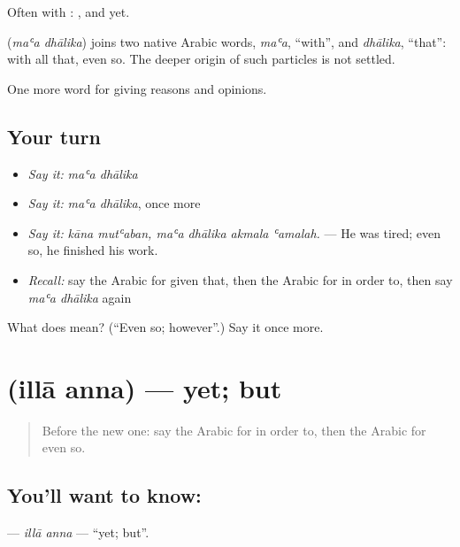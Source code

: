 Often with :  , and yet.

\begin{cousinweb}
\textbf{ } (\emph{maʿa dhālika}) joins two native Arabic words, \emph{maʿa}, \textquotedblleft{}with\textquotedblright{}, and \emph{dhālika}, \textquotedblleft{}that\textquotedblright{}: with all that, even so. The deeper origin of such particles is not settled.
\end{cousinweb}

\begin{grammarlens}[title={What you've built}]
One more word for giving reasons and opinions.
\end{grammarlens}

\subsection*{Your turn}
\begin{itemize}
\raggedright
  \item \emph{Say it:} \emph{maʿa dhālika}
  \item \emph{Say it:} \emph{maʿa dhālika}, once more
  \item \emph{Say it:} \emph{kāna mutʿaban, maʿa dhālika akmala ʿamalah.} — He was tired; even so, he finished his work.
  \item \emph{Recall:} say the Arabic for given that, then the Arabic for in order to, then say \emph{maʿa dhālika} again
\end{itemize}

\begin{tcolorbox}[breakable,colback=teal!4,colframe=teal!35!black,title={Before you move on}]
What does   mean? (\textquotedblleft{}Even so; however\textquotedblright{}.) Say it once more.
\end{tcolorbox}
\section[\texorpdfstring{\ar{إلا} \ar{أن} (illā anna)}{إلا أن (illā anna)}]{  (illā anna) — yet; but}

\label{lesson:AR-C375-illa-anna}



\begin{quote}
Before the new one: say the Arabic for in order to, then the Arabic for even so.
\end{quote}

\subsection*{You'll want to know:  }
\textbf{ } — \emph{illā anna} — \textquotedblleft{}yet; but\textquotedblright{}.

